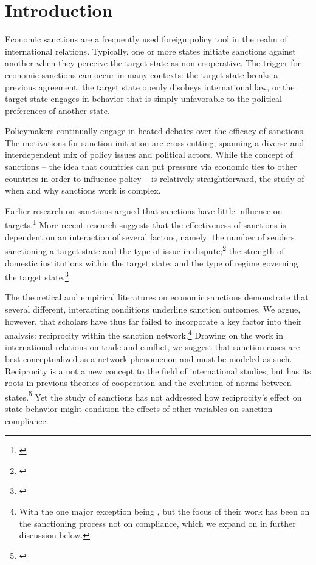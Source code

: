 \section*{Introduction}
\label{intro}

Economic sanctions are a frequently used foreign policy tool in the realm of international relations. Typically, one or more states initiate sanctions against another when they perceive the target state as non-cooperative. The trigger for economic sanctions can occur in many contexts: the target state breaks a previous agreement, the target state openly disobeys international law, or the target state engages in behavior that is simply unfavorable to the political preferences of another state. 

Policymakers continually engage in heated debates over the efficacy of sanctions. The motivations for sanction initiation are cross-cutting, spanning a diverse and interdependent mix of policy issues and political actors. While the concept of sanctions -- the idea that countries can put pressure via economic ties to other countries in order to influence policy -- is relatively straightforward, the study of when and why sanctions work is complex.

Earlier research on sanctions argued that sanctions have little influence on targets.\footnote{\cite{lam1990, dashti1997, morgan1997, drezner1998}} More recent research suggests that the effectiveness of sanctions is dependent on an interaction of several factors, namely: the number of senders sanctioning a target state and the type of issue in dispute;\footnote{\cite{miers2002, morgan2009threat}} the strength of domestic institutions within the target state; and the type of regime governing the target state.\footnote{\cite{mcgillivray2004}} 

The theoretical and empirical literatures on economic sanctions demonstrate that several different, interacting conditions underline sanction outcomes. We argue, however, that scholars have thus far failed to incorporate a key factor into their analysis: reciprocity within the sanction network.\footnote{With the one major exception being \cite{cranmer2014reciprocity}, but the focus of their work has been on the sanctioning process not on compliance, which we expand on in further discussion below.} Drawing on the work in international relations on trade and conflict, we suggest that sanction cases are best conceptualized as a network phenomenon and must be modeled as such. Reciprocity is a not a new concept to the field of international studies, but has its roots in previous theories of cooperation and the evolution of norms between states.\footnote{\cite{richardsonai:1960,choucri:north:1972,goldstein1991reciprocity,rajmaira1990evolving,ward1992reciprocity}} Yet the study of sanctions has not addressed how reciprocity's effect on state behavior might condition the effects of other variables on sanction compliance. 

